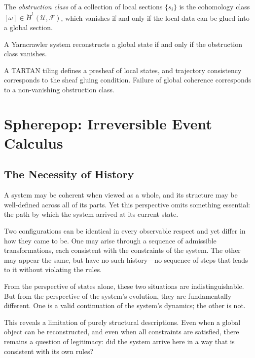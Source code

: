 \documentclass[11pt,openany]{book}
\begin{document}
\begin{definition}
The \emph{obstruction class} of a collection of local
sections $\{s_i\}$ is the cohomology class
$[\omega] \in \check{H}^1(\mathcal{U}, \mathcal{F})$,
which vanishes if and only if the local data can be glued
into a global section.
\end{definition}

\begin{proposition}
\label{prop:reconstruction}
A Yarncrawler system reconstructs a global state if and
only if the obstruction class vanishes.
\end{proposition}

\begin{proposition}
\label{prop:tartan-yarn}
A TARTAN tiling defines a presheaf of local states, and
trajectory consistency corresponds to the sheaf gluing
condition. Failure of global coherence corresponds to a
non-vanishing obstruction class.
\end{proposition}

\chapter{Spherepop: Irreversible Event Calculus}
\label{ch:spherepop}

\section*{ The Necessity of History}

A system may be coherent when viewed as a whole, and its structure may be well-defined across all of its parts. Yet this perspective omits something essential: the path by which the system arrived at its current state.

Two configurations can be identical in every observable respect and yet differ in how they came to be. One may arise through a sequence of admissible transformations, each consistent with the constraints of the system. The other may appear the same, but have no such history—no sequence of steps that leads to it without violating the rules.

From the perspective of states alone, these two situations are indistinguishable. But from the perspective of the system’s evolution, they are fundamentally different. One is a valid continuation of the system’s dynamics; the other is not.

This reveals a limitation of purely structural descriptions. Even when a global object can be reconstructed, and even when all constraints are satisfied, there remains a question of legitimacy: did the system arrive here in a way that is consistent with its own rules?
\end{document}
